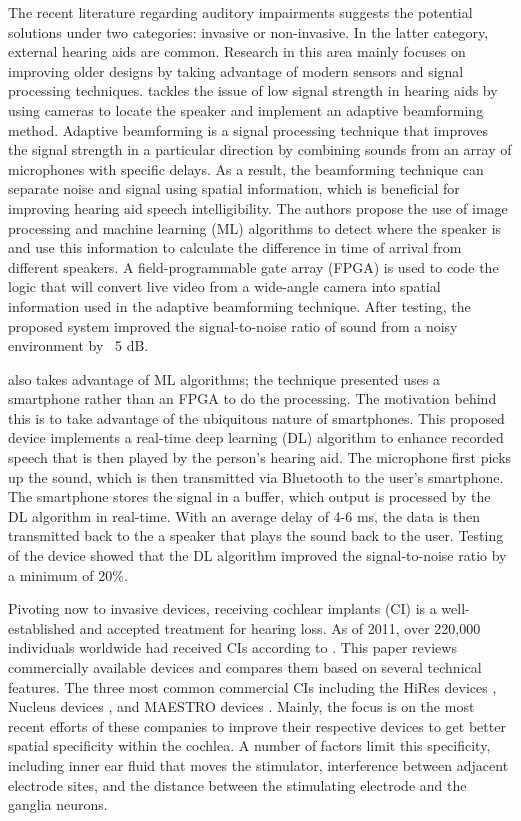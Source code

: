 \tab The recent literature regarding auditory impairments suggests the potential solutions under two categories: invasive or non-invasive. In the latter category, external hearing aids are common. Research in this area mainly focuses on improving older designs by taking advantage of modern sensors and signal processing techniques. \textcite{lin_design_2019} tackles the issue of low signal strength in hearing aids by using cameras to locate the speaker and implement an adaptive beamforming method. Adaptive beamforming is a signal processing technique that improves the signal strength in a particular direction by combining sounds from an array of microphones with specific delays. As a result, the beamforming technique can separate noise and signal using spatial information, which is beneficial for improving hearing aid speech intelligibility. The authors propose the use of image processing and machine learning (ML) algorithms to detect where the speaker is and use this information to calculate the difference in time of arrival from different speakers. A field-programmable gate array (FPGA) is used to code the logic that will convert live video from a wide-angle camera into spatial information used in the adaptive beamforming technique. After testing, the proposed system improved the signal-to-noise ratio of sound from a noisy environment by ~5 dB. 

\textcite{li_smart_2020} also takes advantage of ML algorithms; the technique presented uses a smartphone rather than an FPGA to do the processing. The motivation behind this is to take advantage of the ubiquitous nature of smartphones. This proposed device implements a real-time deep learning (DL) algorithm to enhance recorded speech that is then played by the person's hearing aid. The microphone first picks up the sound, which is then transmitted via Bluetooth to the user's smartphone. The smartphone stores the signal in a buffer, which output is processed by the DL algorithm in real-time. With an average delay of 4-6 ms, the data is then transmitted back to the a speaker that plays the sound back to the user. Testing of the device showed that the DL algorithm improved the signal-to-noise ratio by a minimum of 20\%.

Pivoting now to invasive devices, receiving cochlear implants (CI) is a well-established and accepted treatment for hearing loss. As of 2011, over 220,000 individuals worldwide had received CIs according to \textcite{cosetti_cochlear_2011}. This paper reviews commercially available devices and compares them based on several technical features. The three most common commercial CIs including the HiRes devices \parencite{advanced_bionics}, Nucleus devices \parencite{cochlear_nucleus_systems}, and MAESTRO devices \parencite{med_el_2_maestro}. Mainly, the focus is on the most recent efforts of these companies to improve their respective devices to get better spatial specificity within the cochlea. A number of factors limit this specificity, including inner ear fluid that moves the stimulator, interference between adjacent electrode sites, and the distance between the stimulating electrode and the ganglia neurons. 

